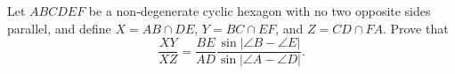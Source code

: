 Let $ABCDEF$ be a non-degenerate cyclic hexagon with no two opposite sides parallel, and define $X=AB\cap DE$, $Y=BC\cap EF$, and $Z=CD\cap FA$. Prove that
\[\frac{XY}{XZ}=\frac{BE}{AD}\frac{\sin |\angle{B}-\angle{E}|}{\sin |\angle{A}-\angle{D}|}.\]